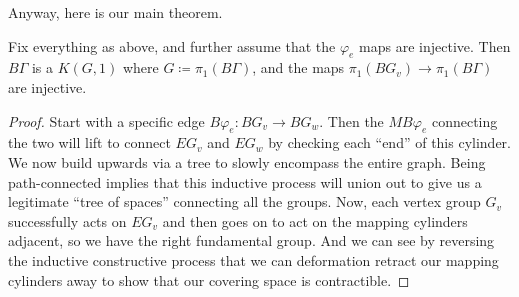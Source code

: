 \documentclass[../notes.tex]{subfiles}
\begin{document}
Anyway, here is our main theorem.
\begin{theorem}
	Fix everything as above, and further assume that the $\varphi_e$ maps are injective. Then $B\Gamma$ is a $K(G,1)$ where $G\coloneqq\pi_1(B\Gamma)$, and the maps $\pi_1(BG_v)\to\pi_1(B\Gamma)$ are injective.
\end{theorem}
\begin{proof}
	Start with a specific edge $B\varphi_e\colon BG_v\to BG_w$. Then the $MB\varphi_e$ connecting the two will lift to connect $EG_v$ and $EG_w$ by checking each ``end'' of this cylinder. We now build upwards via a tree to slowly encompass the entire graph. Being path-connected implies that this inductive process will union out to give us a legitimate ``tree of spaces'' connecting all the groups. Now, each vertex group $G_v$ successfully acts on $EG_v$ and then goes on to act on the mapping cylinders adjacent, so we have the right fundamental group. And we can see by reversing the inductive constructive process that we can deformation retract our mapping cylinders away to show that our covering space is contractible.
\end{proof}
\end{document}

